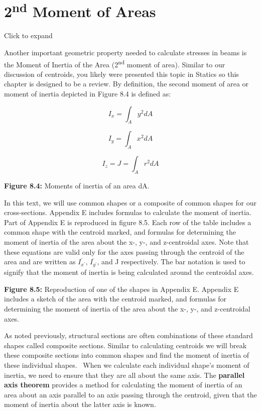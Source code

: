 \documentclass[
  letterpaper,
  DIV=11,
  numbers=noendperiod]{scrreprt}
\begin{document}
\section{\texorpdfstring{2\textsuperscript{nd} Moment of
Areas}{2nd Moment of Areas}}\label{sec-8.2}

Click to expand

Another important geometric property needed to calculate stresses in
beams is the Moment of Inertia of the Area (2\textsuperscript{nd} moment
of area). Similar to our discussion of centroids, you likely were
presented this topic in Statics so this chapter is designed to be a
review. By definition, the second moment of area or moment of inertia
depicted in Figure 8.4 is defined as:

\[
I_x=\int_A y^2 d A
\]

\[
I_y=\int_A x^2 d A
\]

\[
I_z=J=\int_A r^2 d A
\]

\textbf{Figure 8.4:} Moments of inertia of an area dA.

In this text, we will use common shapes or a composite of common shapes
for our cross-sections. Appendix E includes formulas to calculate the
moment of inertia. Part of Appendix E is reproduced in figure 8.5. Each
row of the table includes a common shape with the centroid marked, and
formulas for determining the moment of inertia of the area about the x-,
y-, and z-centroidal axes. Note that these equations are valid only for
the axes passing through the centroid of the area and are written as
\(\overline{I_{x^{\prime}}}\), \(\overline{I_{y^{\prime}}}\), and J
respectively. The bar notation is used to signify that the moment of
inertia is being calculated around the centroidal axes.

\textbf{Figure 8.5:} Reproduction of one of the shapes in Appendix E.
Appendix E includes a sketch of the area with the centroid marked, and
formulas for determining the moment of inertia of the area about the x-,
y-, and z-centroidal axes.

As noted previously, structural sections are often combinations of these
standard shapes called composite sections. Similar to calculating
centroids we will break these composite sections into common shapes and
find the moment of inertia of these individual shapes.~ When we
calculate each individual shape's moment of inertia, we need to ensure
that they are all about the same axis. The \textbf{parallel axis
theorem} provides a method for calculating the moment of inertia of an
area about an axis parallel to an axis passing through the centroid,
given that the moment of inertia about the latter axis is known.
\end{document}
